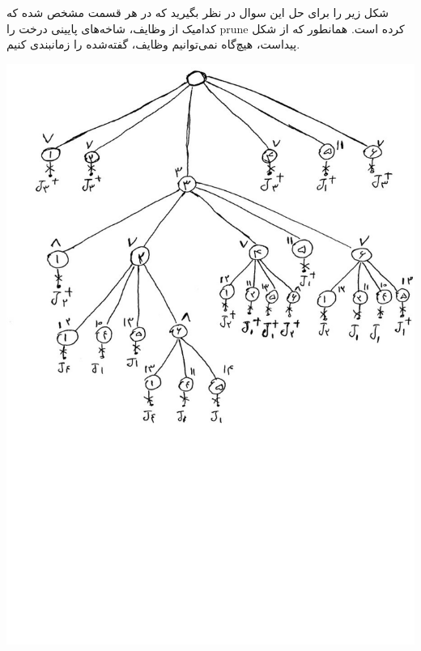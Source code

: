 شکل زیر را برای حل این سوال در نظر بگیرید که در هر قسمت مشخص شده که کدامیک از وظایف، 
شاخه‌های پایینی درخت را 
prune 
کرده است.
همانطور که از شکل پیداست، هیچ‌گاه نمی‌توانیم وظایف، گفته‌شده را زمانبندی کنیم.

  \includegraphics[scale=0.4]{pics/bratley.jpg}




